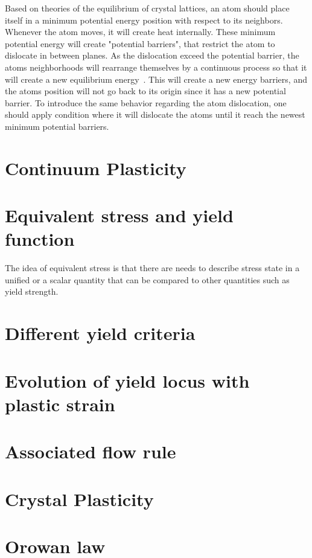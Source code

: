 \documentclass[12pt]{article}
\begin{document}
\hspace{2em}
Based on theories of the equilibrium of crystal lattices, an atom should place itself in a minimum potential energy position
with respect to its neighbors. Whenever the atom moves, it will create heat internally. These minimum potential energy
will create "potential barriers", that restrict the atom to dislocate in between planes. As the dislocation exceed the
potential barrier, the atoms neighborhoods will rearrange themselves by a continuous process so that it will create a 
new equilibrium energy~\cite{taylor1934plastic}. This will create a new energy barriers, and the atoms position will not go back to
its origin since it has a new potential barrier. To introduce the same behavior regarding the atom dislocation, 
one should apply condition where it will dislocate the atoms until it reach the newest minimum potential barriers.

\section*{Continuum Plasticity}
\section{Equivalent stress and yield function}
\hspace{2em}
The idea of equivalent stress is that there are needs to describe stress state in a unified or a scalar quantity
that can be compared to other quantities such as yield strength. 

\section{Different yield criteria}
\section{Evolution of yield locus with plastic strain}
\section{Associated flow rule}

\section*{Crystal Plasticity}
\section{Orowan law}
\end{document}
